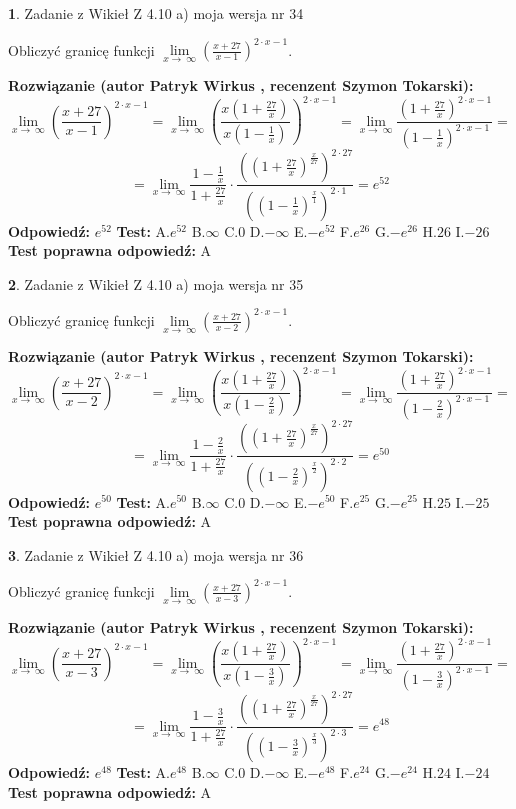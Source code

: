 \documentclass[12pt, a4paper]{article}
\theoremstyle{definition} %
\newtheorem{zad}{}
\newcommand{\zadStart}[1]{\begin{zad}#1\newline}
\newcommand{\zadStop}{\end{zad}}
\newcommand{\rozwStart}[2]{\noindent \textbf{Rozwiązanie (autor #1 , recenzent #2): }\newline}
\newcommand{\rozwStop}{\newline}
\newcommand{\odpStart}{\noindent \textbf{Odpowiedź:}\newline}
\newcommand{\odpStop}{\newline}
\newcommand{\testStart}{\noindent \textbf{Test:}\newline}
\newcommand{\testStop}{\newline}
\newcommand{\kluczStart}{\noindent \textbf{Test poprawna odpowiedź:}\newline}
\newcommand{\kluczStop}{\newline}
\begin{document}
\zadStart{Zadanie z Wikieł Z 4.10 a) moja wersja nr 34}

Obliczyć granicę funkcji  $\lim\limits_{x\to\ \infty}(\frac{x+27}{x-1})^{2\cdot x-1}$.
\zadStop
\rozwStart{Patryk Wirkus}{Szymon Tokarski}
$$\lim\limits_{x\to\ \infty}(\frac{x+27}{x-1})^{2\cdot x-1} = \lim\limits_{x\to\ \infty}(\frac{x(1+\frac{27}{x})}{x(1-\frac{1}{x})})^{2\cdot x-1}=\lim\limits_{x\to\ \infty}\frac{(1+\frac{27}{x})^{2\cdot x-1}}{(1-\frac{1}{x})^{2\cdot x-1}}=$$
$$=\lim\limits_{x\to\ \infty}\frac{1-\frac{1}{x}}{1+\frac{27}{x}}\cdot\frac{((1+\frac{27}{x})^{\frac{x}{27}})^{2\cdot27}}{((1-\frac{1}{x})^{\frac{x}{1}})^{2\cdot1}}=e^{52}$$
\rozwStop
\odpStart
$e^{52}$
\odpStop
\testStart
A.$e^{52}$ B.$\infty$ C.$0$ D.$-\infty$ E.$-e^{52}$
F.$e^{26}$ G.$-e^{26}$
H.$26$
I.$-26$
\testStop
\kluczStart
A
\kluczStop



\zadStart{Zadanie z Wikieł Z 4.10 a) moja wersja nr 35}

Obliczyć granicę funkcji  $\lim\limits_{x\to\ \infty}(\frac{x+27}{x-2})^{2\cdot x-1}$.
\zadStop
\rozwStart{Patryk Wirkus}{Szymon Tokarski}
$$\lim\limits_{x\to\ \infty}(\frac{x+27}{x-2})^{2\cdot x-1} = \lim\limits_{x\to\ \infty}(\frac{x(1+\frac{27}{x})}{x(1-\frac{2}{x})})^{2\cdot x-1}=\lim\limits_{x\to\ \infty}\frac{(1+\frac{27}{x})^{2\cdot x-1}}{(1-\frac{2}{x})^{2\cdot x-1}}=$$
$$=\lim\limits_{x\to\ \infty}\frac{1-\frac{2}{x}}{1+\frac{27}{x}}\cdot\frac{((1+\frac{27}{x})^{\frac{x}{27}})^{2\cdot27}}{((1-\frac{2}{x})^{\frac{x}{2}})^{2\cdot2}}=e^{50}$$
\rozwStop
\odpStart
$e^{50}$
\odpStop
\testStart
A.$e^{50}$ B.$\infty$ C.$0$ D.$-\infty$ E.$-e^{50}$
F.$e^{25}$ G.$-e^{25}$
H.$25$
I.$-25$
\testStop
\kluczStart
A
\kluczStop



\zadStart{Zadanie z Wikieł Z 4.10 a) moja wersja nr 36}

Obliczyć granicę funkcji  $\lim\limits_{x\to\ \infty}(\frac{x+27}{x-3})^{2\cdot x-1}$.
\zadStop
\rozwStart{Patryk Wirkus}{Szymon Tokarski}
$$\lim\limits_{x\to\ \infty}(\frac{x+27}{x-3})^{2\cdot x-1} = \lim\limits_{x\to\ \infty}(\frac{x(1+\frac{27}{x})}{x(1-\frac{3}{x})})^{2\cdot x-1}=\lim\limits_{x\to\ \infty}\frac{(1+\frac{27}{x})^{2\cdot x-1}}{(1-\frac{3}{x})^{2\cdot x-1}}=$$
$$=\lim\limits_{x\to\ \infty}\frac{1-\frac{3}{x}}{1+\frac{27}{x}}\cdot\frac{((1+\frac{27}{x})^{\frac{x}{27}})^{2\cdot27}}{((1-\frac{3}{x})^{\frac{x}{3}})^{2\cdot3}}=e^{48}$$
\rozwStop
\odpStart
$e^{48}$
\odpStop
\testStart
A.$e^{48}$ B.$\infty$ C.$0$ D.$-\infty$ E.$-e^{48}$
F.$e^{24}$ G.$-e^{24}$
H.$24$
I.$-24$
\testStop
\kluczStart
A
\kluczStop
\end{document}
